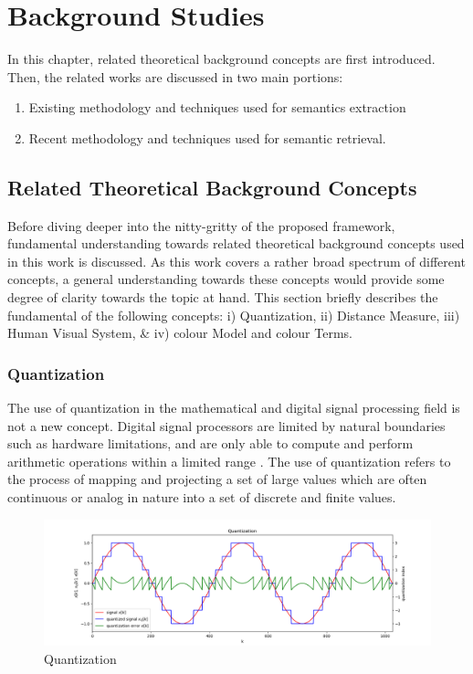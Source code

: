 


\chapter{Background Studies}
\label{section:litreview}

In this chapter, related theoretical background concepts are first introduced. Then, the related works are discussed in two main portions: 
\begin{enumerate}
    \item Existing methodology and techniques used for semantics extraction
    \item Recent methodology and techniques used for semantic retrieval.
\end{enumerate}



\section{Related Theoretical Background Concepts}
\label{subsec:relatedConcepts}

Before diving deeper into the nitty-gritty of the proposed framework, fundamental understanding towards related theoretical background concepts used in this work is discussed. As this work covers a rather broad spectrum of different concepts, a general understanding towards these concepts would provide some degree of clarity towards the topic at hand. This section briefly describes the fundamental of the following concepts: i) Quantization, ii) Distance Measure, iii) Human Visual System, \& iv) colour Model and colour Terms. 


\subsection{Quantization}

The use of quantization in the mathematical and digital signal processing field is not a new concept. Digital signal processors are limited by natural boundaries such as hardware limitations, and are only able to compute and perform arithmetic operations within a limited range \cite{spors_2018}. The use of quantization refers to the process of mapping and projecting a set of large values which are often continuous or analog in nature into a set of discrete and finite values. 

\begin{figure}[hbt!]\centering
\includegraphics[width=\textwidth]{image/general/quantization.png}
\caption{Quantization}
\label{fig:quantize}
\end{figure}


